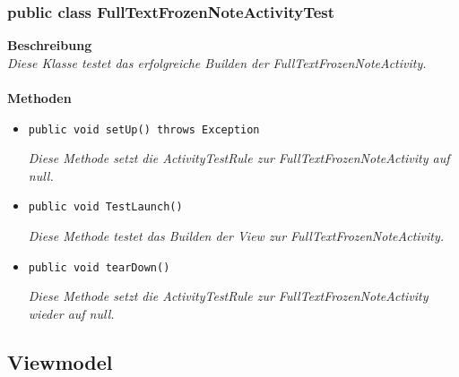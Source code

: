 \documentclass[a4paper]{scrreprt}
\begin{document}
	\subsubsection{public class FullTextFrozenNoteActivityTest}
	\textbf{Beschreibung}\\
	\textit{Diese Klasse testet das erfolgreiche Builden der FullTextFrozenNoteActivity.}\\
	\\	
	\textbf{Methoden}
	\begin{itemize}
		
		\item\texttt{{public void setUp() throws Exception}}
		
		\textit{Diese Methode setzt die ActivityTestRule zur FullTextFrozenNoteActivity auf null.}
		
		\item\texttt{{public void TestLaunch()}}
		
		\textit{Diese Methode testet das Builden der View zur FullTextFrozenNoteActivity.}
		
		\item\texttt{{public void tearDown()}}
		
		\textit{Diese Methode setzt die ActivityTestRule zur FullTextFrozenNoteActivity wieder auf null.}
		
		
	\end{itemize}
	
	\subsection{Viewmodel}
\end{document}
